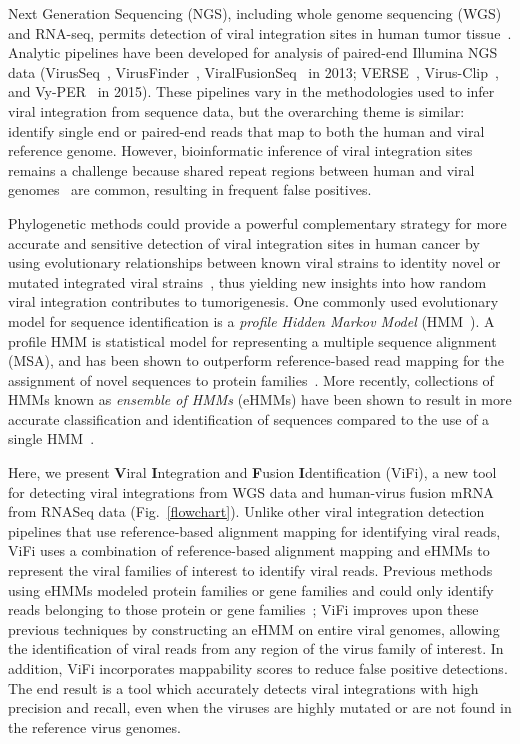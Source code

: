 \documentclass{bmcart}
\begin{document}
Next Generation Sequencing (NGS), including whole genome sequencing (WGS) and RNA-seq, permits detection of viral integration sites in human tumor tissue~\cite{Duncavage2011,Chandrani2015}.  Analytic pipelines have been developed for analysis of paired-end Illumina NGS data (VirusSeq~\cite{Chen2013},
VirusFinder~\cite{Wang2013}, ViralFusionSeq~\cite{Li2013} in 2013;
VERSE~\cite{Wang2015}, Virus-Clip~\cite{Ho2015}, and
Vy-PER~\cite{Forster2015} in 2015).  These pipelines vary in the methodologies used to infer viral integration from sequence data, but the overarching theme is similar: identify
single end or paired-end reads that map to both the human and viral
reference genome. However, bioinformatic inference of viral integration sites remains a challenge because shared repeat regions between human and viral genomes~\cite{Forster2015} are common, resulting in frequent false positives.  

Phylogenetic methods could provide a powerful complementary strategy for more accurate and sensitive detection of viral integration sites in human cancer by using evolutionary relationships between known viral strains to identity novel or mutated integrated viral strains~\cite{Matsen2010a}, thus yielding new insights into how random viral integration contributes to tumorigenesis.  One commonly used evolutionary model for sequence identification is a \emph{profile Hidden Markov Model} (HMM~\cite{Eddy1998}).  A profile HMM is statistical model for representing a multiple sequence alignment (MSA), and has been shown to outperform reference-based read mapping for the assignment of novel sequences to protein families~\cite{Skewes-Cox2014}.  More recently, collections of HMMs known as \emph{ensemble of HMMs} (eHMMs) have been shown to result in more accurate classification and identification of sequences compared to the use of a single HMM~\cite{Nguyen2014,Nguyen2016_hippi}.
 
 Here, we present \textbf{V}iral \textbf{I}ntegration and
\textbf{F}usion \textbf{I}dentification (ViFi), a new tool for
detecting viral integrations from WGS data and human-virus fusion mRNA
from RNASeq data (Fig.~\ref{flowchart}).  Unlike other viral
integration detection pipelines that use reference-based alignment
mapping for identifying viral reads, ViFi uses a combination of
reference-based alignment mapping and eHMMs to represent the viral
families of interest to identify viral reads.  Previous methods using eHMMs 
modeled protein families or gene families and could only identify reads
belonging to those protein or gene families~\cite{Nguyen2014,Nguyen2016_hippi};
ViFi improves upon these previous techniques by constructing an eHMM
on entire viral genomes, allowing the identification of viral reads from any region of 
the virus family of interest.  In addition, ViFi
incorporates mappability scores to reduce false positive detections.
The end result is a tool which accurately detects viral integrations
with high precision and recall, even when the viruses are highly
mutated or are not found in the reference virus genomes.
\end{document}

